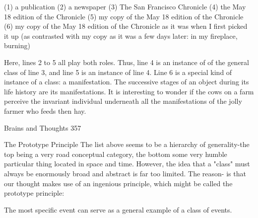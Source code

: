 (1) a publication
 (2) a newspaper
        (3) The San Francisco Chronicle
                (4) the May 18 edition of the Chronicle
                        (5) my copy of the May 18 edition of the Chronicle
                               (6) my copy of the May 18 edition of the Chronicle as
                                      it was when I first picked it up (as contrasted with
                                      my copy as it was a few days later: in my fireplace,
                                      burning)

  Here, lines 2 to 5 all play both roles. Thus, line 4 is an instance of of the general class of
line 3, and line 5 is an instance of line 4. Line 6 is a special kind of instance of a class: a
manifestation. The successive stages of an object during its life history are its
manifestations. It is interesting to wonder if the cows on a farm perceive the invariant
individual underneath all the manifestations of the jolly farmer who feeds then hay.




Brains and Thoughts                                                                        357

                               The Prototype Principle
The list above seems to be a hierarchy of generality-the top being a very road conceptual
category, the bottom some very humble particular thing located in space and time.
However, the idea that a "class" must always be enormously broad and abstract is far too
limited. The reason- is that our thought makes use of an ingenious principle, which might
be called the prototype principle:

                 The most specific event can serve as a general example
                                  of a class of events.

